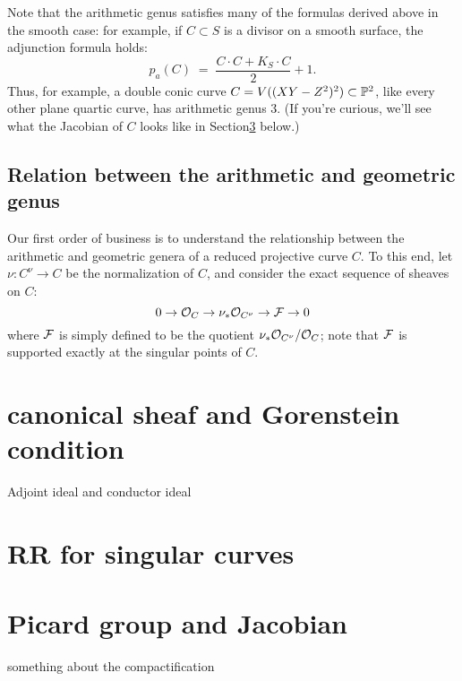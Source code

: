 Note that the arithmetic genus satisfies many of the formulas derived above in the smooth case: for example, if $C \subset S$ is a divisor on a smooth surface, the adjunction formula holds:
$$
p_a(C) \; = \; \frac{C\cdot C + K_S\cdot C}{2} + 1.
$$
Thus, for example, a double conic curve $C = V((XY-Z^2)^2) \subset {\mathbb P}^2$, like every other plane quartic curve, has arithmetic genus 3. (If you're curious, we'll see what the Jacobian of $C$ looks like in Section\ref{} below.)

\subsection{Relation between the arithmetic and geometric genus}

Our first order of business is to understand the relationship between the arithmetic and geometric genera of a reduced projective curve $C$. To this end, let $\nu : C^\nu \to C$ be the normalization of $C$, and consider the exact sequence of sheaves on $C$:
$$
0 \to {\mathcal O}_C \to \nu_*{\mathcal O}_{C^\nu} \to {\mathcal F} \to 0
$$
where ${\mathcal F}$ is simply defined to be the quotient $\nu_*{\mathcal O}_{C^\nu}/{\mathcal O}_C$; note that ${\mathcal F}$ is supported exactly at the singular points of $C$.

\section{canonical sheaf and Gorenstein condition}
Adjoint ideal and conductor ideal

\section{RR for singular curves}

\section{Picard group and Jacobian}
\begin{fact}
 something about the compactification
\end{fact}

